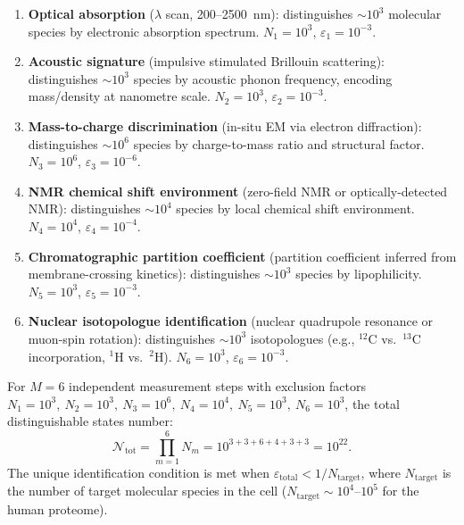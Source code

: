 \begin{enumerate}[label=\textbf{Step \arabic*:}, leftmargin=*, itemsep=4pt]
    \item \textbf{Optical absorption} ($\lambda$ scan, 200--2500~nm):
          distinguishes $\sim 10^3$ molecular species by electronic
          absorption spectrum.  $N_1 = 10^3$, $\varepsilon_1 = 10^{-3}$.

    \item \textbf{Acoustic signature} (impulsive stimulated Brillouin
          scattering): distinguishes $\sim 10^3$ species by acoustic
          phonon frequency, encoding mass/density at nanometre scale.
          $N_2 = 10^3$, $\varepsilon_2 = 10^{-3}$.

    \item \textbf{Mass-to-charge discrimination} (in-situ EM via
          electron diffraction): distinguishes $\sim 10^6$ species by
          charge-to-mass ratio and structural factor.
          $N_3 = 10^6$, $\varepsilon_3 = 10^{-6}$.

    \item \textbf{NMR chemical shift environment} (zero-field NMR or
          optically-detected NMR): distinguishes $\sim 10^4$ species by
          local chemical shift environment.
          $N_4 = 10^4$, $\varepsilon_4 = 10^{-4}$.

    \item \textbf{Chromatographic partition coefficient} (partition
          coefficient inferred from membrane-crossing kinetics):
          distinguishes $\sim 10^3$ species by lipophilicity.
          $N_5 = 10^3$, $\varepsilon_5 = 10^{-3}$.

    \item \textbf{Nuclear isotopologue identification} (nuclear quadrupole
          resonance or muon-spin rotation): distinguishes $\sim 10^3$
          isotopologues (e.g., $^{12}$C vs.\ $^{13}$C incorporation,
          $^{1}$H vs.\ $^{2}$H).
          $N_6 = 10^3$, $\varepsilon_6 = 10^{-3}$.
\end{enumerate}

\begin{theorem}
\label{thm:ch04-sequential-exclusion}
For $M = 6$ independent measurement steps with exclusion factors
$N_1 = 10^3,\ N_2 = 10^3,\ N_3 = 10^6,\ N_4 = 10^4,\ N_5 = 10^3,\
N_6 = 10^3$, the total distinguishable states number:
\begin{equation}
\label{eq:ch04-total-distinguishable}
    \mathcal{N}_{\mathrm{tot}}
        = \prod_{m=1}^{6} N_m
        = 10^{3+3+6+4+3+3}
        = 10^{22}.
\end{equation}
The unique identification condition is met when
$\varepsilon_{\mathrm{total}} < 1/N_{\mathrm{target}}$, where
$N_{\mathrm{target}}$ is the number of target molecular species in the
cell ($N_{\mathrm{target}} \sim 10^4$--$10^5$ for the human proteome).
\end{theorem}

